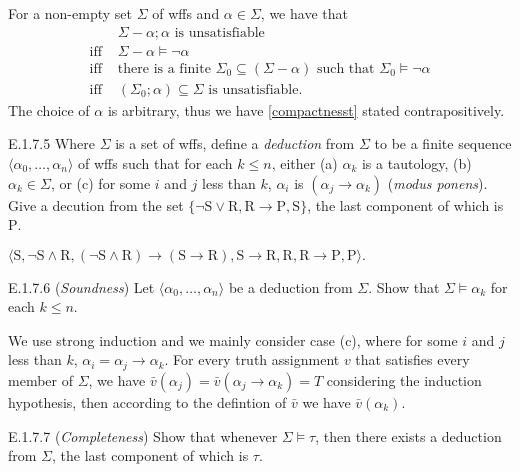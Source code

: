 For a non-empty set $\Sigma$ of wffs and $\alpha\in \Sigma$, we have that
\begin{align*}
              & \Sigma-\alpha;\alpha\text{ is unsatisfiable}                                                        \\
  \text{iff } & \Sigma-\alpha\vDash\neg\alpha                                                                       \\
  \text{iff } & \text{there is a finite }\Sigma_0\subseteq(\Sigma-\alpha)\text{ such that }\Sigma_0\vDash\neg\alpha \\
  \text{iff } & (\Sigma_0;\alpha)\subseteq \Sigma\text{ is unsatisfiable}.
\end{align*}
The choice of $\alpha$ is arbitrary, thus we have \ref{compactnesst} stated contrapositively.

\setcounter{exercise}{4}

\begin{exercise}{E.1.7.5}
  Where $\Sigma$ is a set of wffs, define a \textit{deduction} from $\Sigma$ to be a finite sequence $\langle \alpha_0,\dots,\alpha_n\rangle$ of wffs such that for each $k\leq n$, either (a) $\alpha_k$ is a tautology, (b) $\alpha_k\in \Sigma$, or (c) for some $i$ and $j$ less than $k$, $\alpha_i$ is $(\alpha_j\rightarrow \alpha_k)$ (\textit{modus ponens}). Give a decution from the set $\{\mathrm{\neg S\vee R, R\rightarrow P, S}\}$, the last component of which is $\mathrm{P}$.
\end{exercise}

$\mathrm{\langle S,\neg S\wedge R, (\neg S\wedge R)\rightarrow(S\rightarrow R), S\rightarrow R, R, R\rightarrow P, P\rangle.}$

\begin{exercise}{E.1.7.6}
  (\textit{Soundness}) Let $\langle \alpha_0,\dots,\alpha_n\rangle$ be a deduction from $\Sigma$. Show that $\Sigma\vDash \alpha_k$ for each $k\leq n$.
\end{exercise}

We use strong induction and we mainly consider case (c), where for some $i$ and $j$ less than $k$, $\alpha_i=\alpha_j\rightarrow \alpha_k$. For every truth assignment $v$ that satisfies every member of $\Sigma$, we have $\bar{v}(\alpha_j)=\bar{v}(\alpha_j\rightarrow \alpha_k)=T$ considering the induction hypothesis, then according to the defintion of $\bar{v}$ we have $\bar{v}(\alpha_k)$.

\begin{exercise}{E.1.7.7}
  (\textit{Completeness}) Show that whenever $\Sigma\vDash \tau$, then there exists a deduction from $\Sigma$, the last component of which is $\tau$.
\end{exercise}

